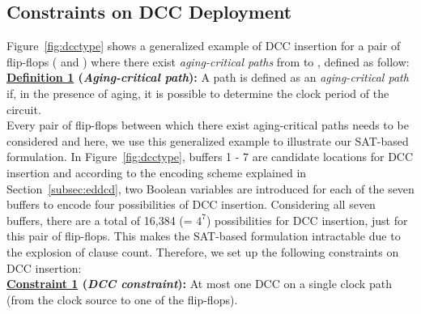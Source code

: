 \subsection{Constraints on DCC Deployment}
\label{subsec:dccccc}
Figure~\ref{fig:dcctype} shows a generalized example of DCC insertion for a pair of flip-flops ( and ) where there exist \textit{aging-critical paths} from  to , defined as follow:\\

\noindent \textbf{\uline{Definition 1} (\textit{Aging-critical path}):}  A path is defined as an \textit{aging-critical path} if, in the presence of aging, it is possible to determine the clock period of the circuit.\\ 

Every pair of flip-flops between which there exist aging-critical paths needs to be considered and here, we use this generalized example to illustrate our SAT-based formulation. In Figure~\ref{fig:dcctype}, buffers 1 - 7 are candidate locations for DCC insertion and according to the encoding scheme explained in Section~\ref{subsec:eddcd}, two Boolean variables are introduced for each of the seven buffers to encode four possibilities of DCC insertion. Considering all seven buffers, there are a total of 16,384 (= $4^7$) possibilities for DCC insertion, just for this pair of flip-flops. This makes the SAT-based formulation intractable due to the explosion of clause count. Therefore, we set up the following constraints on DCC insertion: \\

\noindent \textbf{\uline{Constraint 1} (\textit{DCC constraint}):} At most one DCC on a single clock path (from the clock source to one of the flip-flops).\\

